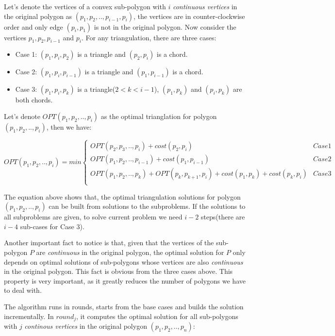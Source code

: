 Let's denote the vertices of a convex sub-polygon with $i$ \textit{continuous vertices} in the original polygon as $(p_1, p_2, .., p_{i-1}, p_i)$, the vertices are in counter-clockwise order and only edge $(p_i, p_1)$ is not in the original polygon. Now consider the vertices $p_1, p_2, p_{i-1}$ and $p_i$. For any triangulation, there are three cases:

\begin{itemize}
\item{Case 1}: $(p_1, p_i, p_2)$ is a triangle and $(p_2, p_i)$ is a chord.
\item{Case 2}: $(p_1, p_i, p_{i-1})$ is a triangle and  $(p_1, p_{i-1})$ is a chord.
\item{Case 3}: $(p_1, p_i, p_k)$ is a triangle($2 < k < i-1$), $(p_1, p_k)$ and $(p_i, p_k)$ are both chords.
\end{itemize}

Let's denote $OPT(p_1, p_2, .., p_i)$ as the optimal trianglation for polygon $(p_1, p_2, .., p_i)$, then we have:

\[
OPT(p_1, p_2, .., p_i) = min \left\{
  \begin{array}{ll}
    OPT(p_2, p_3, .., p_i) + cost(p_2, p_i) & Case 1 \\
    OPT(p_1, p_2, .., p_{i-1}) + cost(p_1, p_{i-1})  & Case 2 \\
    OPT(p_1, p_2, .., p_k) + OPT(p_k, p_{k+1}, p_i) + cost(p_1, p_k) + cost(p_k, p_i)  & Case 3 \\
  \end{array}\right.
\]

The equation above shows that, the optimal triangulation solutions for polygon $(p_1, p_2, .., p_i)$ can be built from solutions to the subproblems. If the solutions to all subproblems are given, to solve current problem we need $i-2$ steps(there are $i-4$ sub-cases for Case 3).

Another important fact to notice is that, given that the vertices of the sub-polygon $P$ are \textit{continuous} in the original polygon, the optimal solution for $P$ only depends on optimal solutions of sub-polygons whose vertices are also \textit{continuous} in the original polygon. This fact is obvious from the three cases above. This property is very important, as it greatly reduces the number of polygons we have to deal with.

The algorithm runs in rounds, starts from the base cases and builds the solution incrementally. In $round_j$, it computes the optimal solution for all sub-polygons with $j$ \textit{continous vertices} in the original polygon $(p_1, p_2, .., p_n)$:

